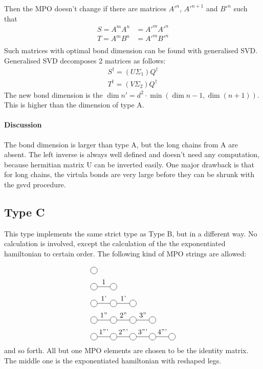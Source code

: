 Then the MPO doesn't change if there are matrices $A'^{n}$, $A'^{n+1}$ and $B'^{n}$ such that
\begin{equation}
    \begin{split}
        S=A^{m} A^{n} &= A'^{m} A'^{n} \\
        T=A^{m} B^{n} &= A'^{m} B'^{n} \\
    \end{split}
\end{equation}
Such matrices with optimal bond dimension can be found with generalised SVD. Generalised SVD decomposes 2 matrices as follows:
\begin{equation}
    \begin{split}
        S^{\dagger} = (U \Sigma_1) Q^{\dagger} \\
        T^{\dagger} = (V \Sigma_2) Q^{\dagger}
    \end{split}
\end{equation}
The new bond dimension is the $\dim{n'} =d^2 \cdot \min( \dim{n-1}, \dim (n+1) )$.  This is higher than the dimension of type A.

\paragraph{Discussion}
The bond dimension is larger than type A, but the long chains from A are absent. The left inverse is always well defined and doesn't need any computation, because hermitian matrix U can be inverted easily. One major drawback is that for long chains, the virtula bonds are very large before they can be shrunk with the gsvd procedure.

\subsection{Type C}

This type implements the same strict type as Type B, but in a different way. No calculation is involved, except the calculation of the the exponentiated hamiltonian to certain order. The following kind of MPO strings are allowed:

\begin{equation}
    \begin{split}
        &\mpob{1}{ {,}  }{}{}{}{{,,}} \\
        &\mpob{2}{ {,"1",}  }{}{}{}{{,,}}\\
        &\mpob{3}{ {,"1'","1'",}  }{}{}{}{{,,,}}\\
        &\mpob{4}{ {,"1''","2''","3''",}  }{}{}{}{{,,,,,}}\\
        &\mpob{5}{ {,"1'''","2'''","3'''","4'''",}  }{}{}{}{{,,,,,}}\\
    \end{split}
\end{equation}
and so forth. All but one MPO elements are chosen to be the identity matrix. The middle one is the exponentiated hamiltonian with reshaped legs.

